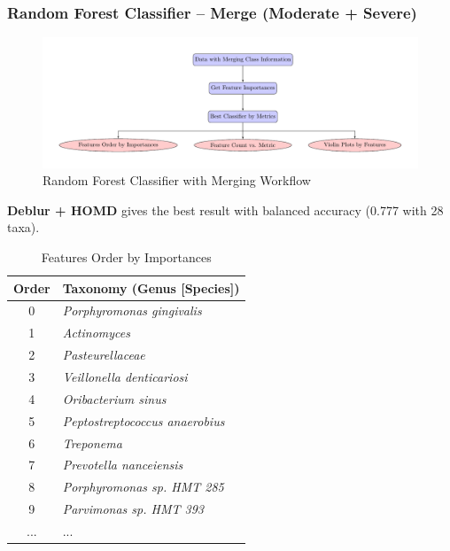 \documentclass{beamer}
\begin{document}
    \begin{frame}[allowframebreaks]
        \frametitle{Random Forest Classifier -- Merge (Moderate + Severe)}

        \begin{figure}
            \includegraphics[width=0.8 \linewidth]{figures/RandomForest/merge.pdf}
            \caption{Random Forest Classifier with Merging Workflow}
        \end{figure}

        \textbf{Deblur + HOMD} gives the best result with balanced accuracy (0.777 with 28 taxa).

        \begin{table}
            \caption{Features Order by Importances}
            \begin{tabular}{c|l}
                Order & Taxonomy (Genus [Species]) \\ \hline
                0 & \textit{Porphyromonas gingivalis} \\
                1 & \textit{Actinomyces} \\
                2 & \textit{Pasteurellaceae} \\
                3 & \textit{Veillonella denticariosi} \\
                4 & \textit{Oribacterium sinus} \\
                5 & \textit{Peptostreptococcus anaerobius} \\
                6 & \textit{Treponema} \\
                7 & \textit{Prevotella nanceiensis} \\
                8 & \textit{Porphyromonas sp. HMT 285} \\
                9 & \textit{Parvimonas sp. HMT 393} \\
                ... & ... \\
            \end{tabular}
        \end{table}


\end{frame}
\end{document}
